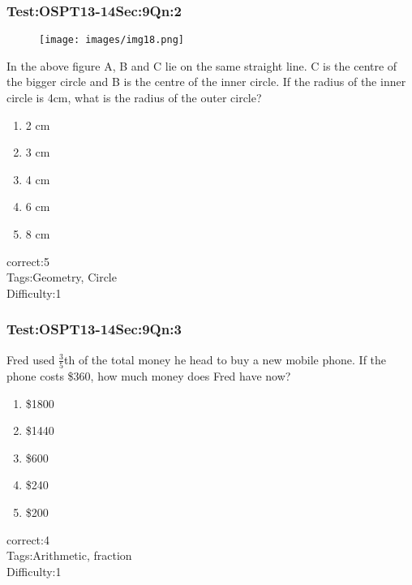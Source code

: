 \documentclass[]{beamer}
\begin{document}
    \begin{frame}
	    \frametitle{Test:OSPT13-14\hspace{2mm}Sec:9\hspace{2mm}Qn:2}
	    \begin{figure}
	    \begin{center}
	    \texttt{[image: images/img18.png]}
	    \end{center}
	    \end{figure}
	    In the above figure A, B and C lie on the same straight line. C is the centre of the bigger circle and B is the centre of the inner circle. If the radius of the inner circle is 4cm, what is the radius of the outer circle?
	   \begin{enumerate}
	        \item
	           2 cm
	        \item
	           3 cm 
	        \item
	           4 cm
	        \item
	           6 cm 
	        \item
	           8 cm
	    \end{enumerate}
	    correct:5\\   
	    Tags:Geometry, Circle \\
	    Difficulty:1   \\
    \end{frame}    
    \begin{frame}
	    \frametitle{Test:OSPT13-14\hspace{2mm}Sec:9\hspace{2mm}Qn:3}
	    Fred used $\frac{3}{5}$th of the total money he head to buy a new mobile phone. If the phone costs \$360, how much money does Fred have now?
	   \begin{enumerate}
	        \item
	           \$1800
	        \item
	            \$1440
	        \item
	           \$600
	        \item
	            \$240
	        \item
	           \$200
	    \end{enumerate}
	    correct:4\\   
	    Tags:Arithmetic, fraction \\
	    Difficulty:1   \\
    \end{frame}    
\end{document}
